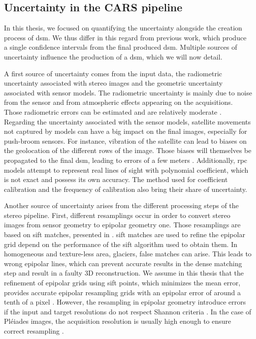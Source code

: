 \subsection{Uncertainty in the CARS pipeline}\label{sec:uncertainty_cars}
In this thesis, we focused on quantifying the uncertainty alongside the creation process of \acrshort{dsm}. We thus differ in this regard from previous work, which produce a single confidence intervals from the final produced \acrshort{dsm}. Multiple sources of uncertainty influence the production of a \acrshort{dsm}, which we will now detail.

A first source of uncertainty comes from the input data, \ie the radiometric uncertainty associated with stereo images and the geometric uncertainty associated with sensor models. The radiometric uncertainty is mainly due to noise from the sensor and from atmospheric effects appearing on the acquisitions. Those radiometric errors can be estimated and are relatively moderate \cite{jacobsen_radiometric_2014}. Regarding the uncertainty associated with the sensor models, satellite movements not captured by models can have a big impact on the final images, especially for push-broom sensors. For instance, vibration of the satellite can lead to biases on the geolocation of the different rows of the image. Those biases will themselves be propagated to the final \acrshort{dsm}, leading to errors of a few meters \cite{loghin_accuracy_2019}. Additionally, \acrshort{rpc} models attempt to represent real lines of sight with polynomial coefficient, which is not exact and possess its own accuracy. The method used for coefficient calibration and the frequency of calibration also bring their share of uncertainty. 

Another source of uncertainty arises from the different processing steps of the stereo pipeline. First, different resamplings occur in order to convert stereo images from sensor geometry to epipolar geometry one. Those resamplings are based on \acrshort{sift} matches, presented in . \acrshort{sift} matches are used to refine the epipolar grid depend on the performance of the \acrshort{sift} algorithm used to obtain them. In homogeneous and texture-less area, \eg glaciers, false matches can arise. This leads to wrong epipolar lines, which can prevent accurate results in the dense matching step and result in a faulty 3D reconstruction.  We assume in this thesis that the refinement of epipolar grids using \acrshort{sift} points, which minimizes the mean error, provides accurate epipolar resampling grids with an epipolar error of around a tenth of a pixel \cite{franchis_automatic_2014}. However, the resampling in epipolar geometry introduce errors if the input and target resolutions do not respect Shannon criteria \cite{delon_small_2007}. In the case of Pléiades images, the acquisition resolution is usually high enough to ensure correct resampling \cite{jacobsen_radiometric_2014}. 

